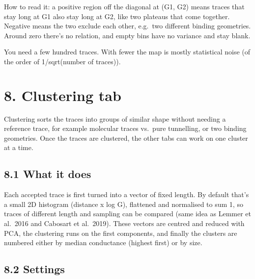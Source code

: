 \documentclass[
  11pt,
  a4paper,
]{article}
\begin{document}
How to read it: a positive region off the diagonal at (G1, G2) means
traces that stay long at G1 also stay long at G2, like two plateaus that
come together. Negative means the two exclude each other, e.g.~two
different binding geometries. Around zero there's no relation, and empty
bins have no variance and stay blank.

You need a few hundred traces. With fewer the map is mostly statistical
noise (of the order of 1/sqrt(number of traces)).

\hypertarget{clustering-tab}{%
\section{8. Clustering tab}\label{clustering-tab}}

Clustering sorts the traces into groups of similar shape without needing
a reference trace, for example molecular traces vs.~pure tunnelling, or
two binding geometries. Once the traces are clustered, the other tabs
can work on one cluster at a time.

\hypertarget{what-it-does}{%
\subsection{8.1 What it does}\label{what-it-does}}

Each accepted trace is first turned into a vector of fixed length. By
default that's a small 2D histogram (distance x log G), flattened and
normalised to sum 1, so traces of different length and sampling can be
compared (same idea as Lemmer et al.~2016 and Cabosart et al.~2019).
These vectors are centred and reduced with PCA, the clustering runs on
the first components, and finally the clusters are numbered either by
median conductance (highest first) or by size.

\hypertarget{settings-2}{%
\subsection{8.2 Settings}\label{settings-2}}
\end{document}
